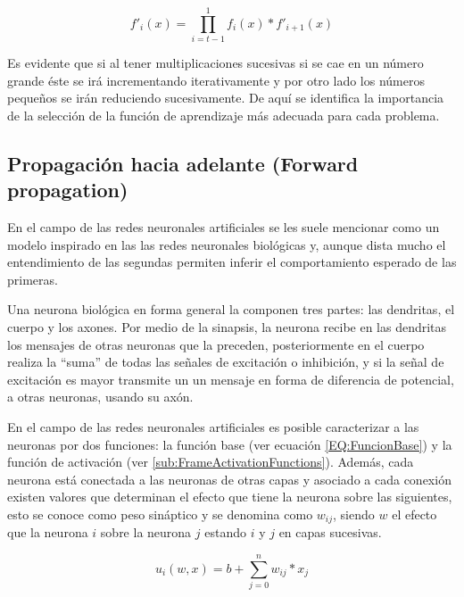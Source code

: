             \begin{equation}
                \label{EQ:VanisingGradient}
                {f'}_i(x) = \prod_{i=t-1}^{1} f_i(x) * {f'}_{i+1}(x)
            \end{equation}
            
            Es evidente que si al tener multiplicaciones sucesivas si se cae en un número grande éste se irá incrementando iterativamente y por otro lado los números pequeños se irán reduciendo sucesivamente. De aquí se identifica la importancia de la selección de la función de aprendizaje más adecuada para cada problema.
            
    \subsection{Propagación hacia adelante (Forward propagation)}
    \label{sub:FrameForwardPropagation}
    
        En el campo de las redes neuronales artificiales se les suele mencionar como un modelo inspirado en las las redes neuronales biológicas y, aunque dista mucho el entendimiento de las segundas permiten inferir el comportamiento esperado de las primeras.
        
        Una neurona biológica en forma general la componen tres partes: las dendritas, el cuerpo y los axones. Por medio de la sinapsis, la neurona recibe en las dendritas los mensajes de otras neuronas que la preceden, posteriormente en el cuerpo realiza la ``suma'' de todas las señales de excitación o inhibición, y si la señal de excitación es mayor transmite un un mensaje en forma de diferencia de potencial, a otras neuronas, usando su axón.
        
        En el campo de las redes neuronales artificiales es posible caracterizar a las neuronas por dos funciones: la función base (ver ecuación \ref{EQ:FuncionBase}) y la función de activación (ver \ref{sub:FrameActivationFunctions}). Además, cada neurona está conectada a las neuronas de otras capas y asociado a cada conexión existen valores que determinan el efecto que tiene la neurona sobre las siguientes, esto se conoce como peso sináptico y se denomina como $w_{ij}$, siendo $w$ el efecto que la neurona $i$ sobre la neurona $j$ estando $i$ y $j$ en capas sucesivas.
        
        \begin{equation}
            \label{EQ:FuncionBase}
            u_i(w, x) = b + \sum_{j=0}^n w_{ij} * x_j 
        \end{equation}

